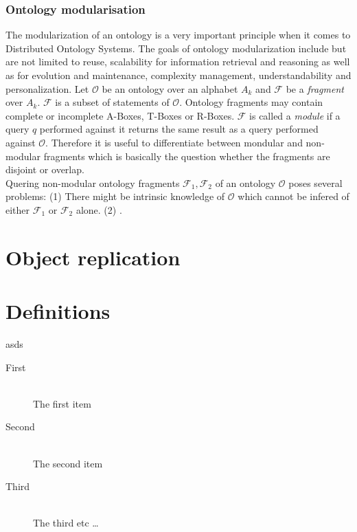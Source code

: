 \subsubsection{Ontology modularisation}
The modularization of an ontology is a very important principle when
it comes to Distributed Ontology Systems.
The goals of ontology modularization include but are not limited to reuse,
scalability for information retrieval and reasoning as well as for evolution and
maintenance, complexity management, understandability and personalization.
Let $\mathcal{O}$ be an ontology over an alphabet $A_k$ and $\mathcal{F}$
be a \emph{fragment} over $A_k$. $\mathcal{F}$ is a subset of statements
of $\mathcal{O}$.
Ontology fragments may contain complete or incomplete A-Boxes, T-Boxes
or R-Boxes.
$\mathcal{F}$ is called a \emph{module} if a query $q$ performed against
it returns the same result as a query performed against $\mathcal{O}$.
Therefore it is useful to differentiate between mondular and non-modular
fragments which is basically the question whether the fragments are disjoint
or overlap.\\
Quering non-modular ontology fragments $\mathcal{F}_1,\mathcal{F}_2$ of
an ontology $\mathcal{O}$ poses several problems:
(1) There might be intrinsic knowledge of $\mathcal{O}$ which cannot be
infered of either $\mathcal{F}_1$ or $\mathcal{F}_2$ alone.
(2) .




\section{Object replication}




\section{Definitions}
asds

\begin{description}
  \item[First] \hfill \\
  The first item
  \item[Second] \hfill \\
  The second item
  \item[Third] \hfill \\
  The third etc \ldots
\end{description}










%






